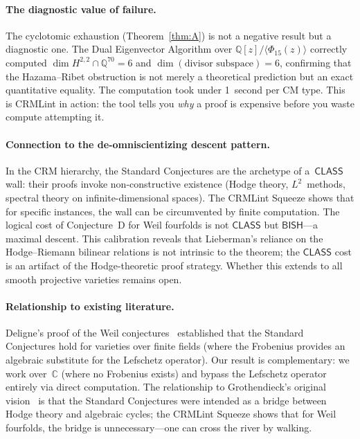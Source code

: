 \documentclass[11pt]{article}
\theoremstyle{plain}
\theoremstyle{definition}
\theoremstyle{remark}
\newcommand{\Q}{\mathbb{Q}}
\newcommand{\C}{\mathbb{C}}
\newcommand{\BISH}{\mathsf{BISH}}
\newcommand{\CLASS}{\mathsf{CLASS}}
\begin{document}
\paragraph{The diagnostic value of failure.}
The cyclotomic exhaustion (Theorem~\ref{thm:A}) is not a negative result
but a diagnostic one.  The Dual Eigenvector Algorithm over
$\Q[z]/\langle\Phi_{15}(z)\rangle$ correctly computed
$\dim H^{2,2} \cap \Q^{70} = 6$ and $\dim(\text{divisor subspace}) = 6$,
confirming that the Hazama--Ribet obstruction is not merely a theoretical
prediction but an exact quantitative equality.  The computation took under
1~second per CM type.  This is CRMLint in action: the tool tells you
\emph{why} a proof is expensive before you waste compute attempting it.

\paragraph{Connection to the de-omniscientizing descent pattern.}
In the CRM hierarchy, the Standard Conjectures are the archetype of
a~$\CLASS$ wall: their proofs invoke non-constructive existence (Hodge
theory, $L^2$~methods, spectral theory on infinite-dimensional spaces).
The CRMLint Squeeze shows that for specific instances, the wall can be
circumvented by finite computation.  The logical cost of Conjecture~D for
Weil fourfolds is not $\CLASS$ but $\BISH$---a maximal descent.  This
calibration reveals that Lieberman's reliance on the Hodge--Riemann
bilinear relations is not intrinsic to the theorem; the $\CLASS$ cost
is an artifact of the Hodge-theoretic proof strategy.  Whether
this extends to all smooth projective varieties remains open.

\paragraph{Relationship to existing literature.}
Deligne's proof of the Weil conjectures~\cite{deligne1974} established
that the Standard Conjectures hold for varieties over finite fields (where
the Frobenius provides an algebraic substitute for the Lefschetz operator).
Our result is complementary: we work over~$\C$ (where no Frobenius exists)
and bypass the Lefschetz operator entirely via direct computation.  The
relationship to Grothendieck's original vision~\cite{grothendieck1969} is
that the Standard Conjectures were intended as a bridge between Hodge theory
and algebraic cycles; the CRMLint Squeeze shows that for Weil fourfolds,
the bridge is unnecessary---one can cross the river by walking.
\end{document}
